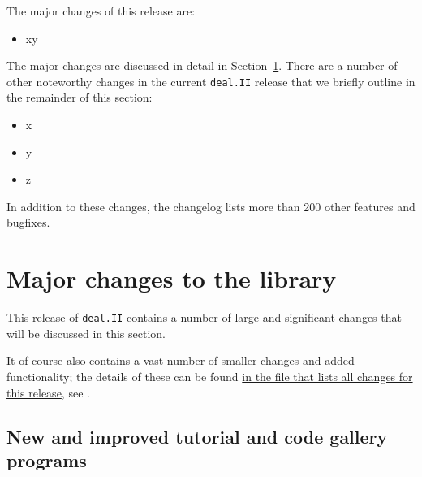 \documentclass{ansarticle-preprint}
\newcommand{\specialword}[1]{\texttt{#1}}
\newcommand{\dealii}{{\specialword{deal.II}}\xspace}
\begin{document}
The major changes of this release are:
%
\begin{itemize}
\item xy 
\end{itemize}
%
The major changes are discussed in detail in Section~\ref{sec:major}. There
are a number of other noteworthy changes in the current \dealii{} release
that we briefly outline in the remainder of this section:
%
\begin{itemize}
\item x 
\item y 
\item z 
\end{itemize}
%
In addition to these changes, the changelog lists more than 200 other
features and bugfixes.




\section{Major changes to the library}
\label{sec:major}

This release of \dealii contains a number of large and significant changes
that will be discussed in this section.

It of course also contains a
vast number of smaller changes and added functionality; the details of these
can be found
\href{https://dealii.org/developer/doxygen/deal.II/changes_between_9_0_1_and_9_1_0.html}{
in the file that lists all changes for this release}, see \cite{changes91}.

\subsection{New and improved tutorial and code gallery programs}
\label{subsec:steps}
\end{document}
